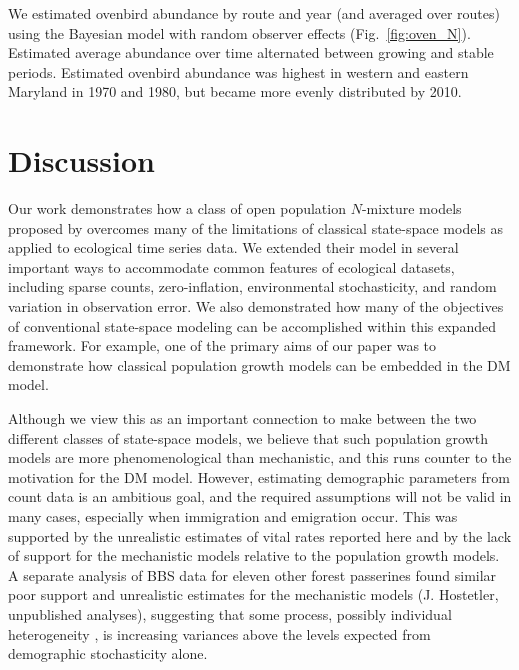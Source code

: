 \documentclass[12pt,english]{article}
\begin{document}
\begin{spacing}{1.9}
\begin{flushleft}
We estimated ovenbird abundance by route and year (and averaged over routes) 
using the Bayesian model with random observer effects (Fig.~\ref{fig:oven_N}).  
Estimated average abundance over time alternated between growing and stable periods.  
Estimated ovenbird
abundance was highest in western and eastern Maryland in 1970 and 1980, but became
more evenly distributed by 2010.  

\section*{Discussion}

Our work demonstrates how a class of open population $N$-mixture models
proposed by \citet{dail_madsen:2011} overcomes 
many of the limitations of classical state-space models as applied to
ecological time series data.
We extended their model in several important
ways to accommodate common features of ecological
datasets, including sparse counts, zero-inflation, environmental
stochasticity, and random variation in observation error.
We also demonstrated how many of the objectives of conventional
state-space modeling can be accomplished within this expanded
framework. For example, one of the primary aims of our paper was to demonstrate how classical
population growth models can be embedded in the DM model.

Although we view this as an important connection to make between the two
different classes of state-space models, we believe that
such population growth models are more phenomenological
than mechanistic, and this runs counter to the motivation for
the DM model. However, estimating
demographic parameters from count data is an ambitious goal, and
the required assumptions will not be valid in many cases,
especially when immigration and emigration occur. This was supported by the
unrealistic estimates of vital rates reported here and by the
lack of support for the mechanistic models relative to the population
growth models.  A separate analysis of BBS data for eleven other forest passerines
found similar poor support and unrealistic estimates for the mechanistic 
models (J. Hostetler, unpublished analyses), suggesting that some process, possibly
individual heterogeneity \citep{vindenes_etal:2008}, is increasing variances
above the levels expected from demographic stochasticity alone.


\end{flushleft}
\end{spacing}
\end{document}
